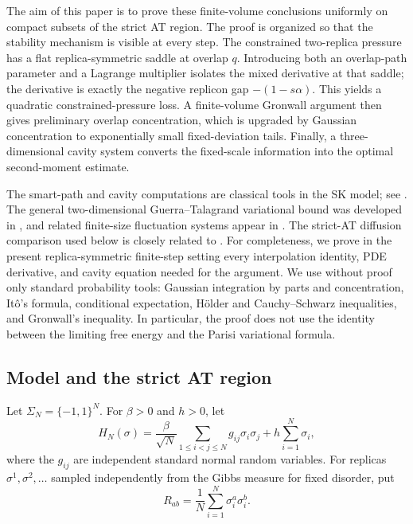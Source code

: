 \documentclass[11pt]{article}
\numberwithin{equation}{section}
\theoremstyle{plain}
\theoremstyle{definition}
\newcommand{\1}{\mathbf 1}
\begin{document}
The aim of this paper is to prove these finite-volume conclusions
uniformly on compact subsets of the strict AT region.  The proof is
organized so that the stability mechanism is visible at every step.
The constrained two-replica pressure has a flat replica-symmetric
saddle at overlap $q$.  Introducing both an overlap-path parameter and
a Lagrange multiplier isolates the mixed derivative at that saddle;
the derivative is exactly the negative replicon gap
$-(1-s\alpha)$.  This yields a quadratic constrained-pressure loss.
A finite-volume Gronwall argument then gives preliminary overlap
concentration, which is upgraded by Gaussian concentration to
exponentially small fixed-deviation tails.  Finally, a
three-dimensional cavity system converts the fixed-scale information
into the optimal second-moment estimate.

The smart-path and cavity computations are classical tools in the SK
model; see \cite{Talagrand,Panchenko}.  The general two-dimensional
Guerra--Talagrand variational bound was developed in \cite{ChenGT}, and
related finite-size fluctuation systems appear in \cite{DeyWu}.  The
strict-AT diffusion comparison used below is closely related to
\cite{Lopatto}.  For completeness, we prove in the present
replica-symmetric finite-step setting every interpolation identity,
PDE derivative, and cavity equation needed for the argument.  We use
without proof only standard probability tools: Gaussian integration
by parts and concentration, It\^o's formula, conditional expectation,
H\"older and Cauchy--Schwarz inequalities, and Gronwall's inequality.
In particular, the proof does not use the identity between the
limiting free energy and the Parisi variational formula.

\subsection{Model and the strict AT region}

Let $\Sigma_N=\{-1,1\}^N$.  For $\beta>0$ and $h>0$, let
\[
 H_N(\sigma)
 =
 \frac{\beta}{\sqrt N}\sum_{1\le i<j\le N}g_{ij}\sigma_i\sigma_j
 +h\sum_{i=1}^N\sigma_i ,
\]
where the $g_{ij}$ are independent standard normal random variables.
For replicas $\sigma^1,\sigma^2,\ldots$ sampled independently from the
Gibbs measure for fixed disorder, put
\[
 R_{ab}=\frac1N\sum_{i=1}^N\sigma_i^a\sigma_i^b.
\]
\end{document}
